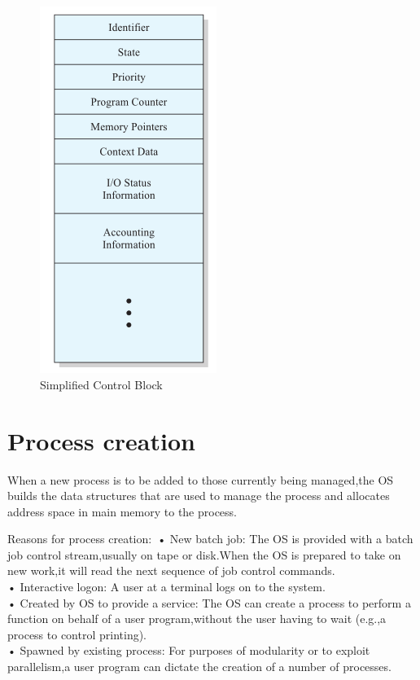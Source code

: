 \\
\\
\begin{figure}
\centering
\includegraphics{img/simplifiedcontrolblock.PNG}
\caption{Simplified Control Block}
\label{fig:simpblock}
\end{figure}


\section{Process creation}
When a new process is to be added to those currently being
managed,the OS builds the data structures that are used to manage the process and
allocates address space in main memory to the process. 

Reasons for process creation:\
• New batch job: The OS is provided with a batch job control stream,usually on tape or
disk.When the OS is prepared to take on new work,it will read the
next sequence of job control commands.\\
• Interactive logon: A user at a terminal logs on to the system.\\
• Created by OS to provide a service: The OS can create a process to perform a function on behalf of a user
program,without the user having to wait (e.g.,a process to control
printing).\\
• Spawned by existing process: For purposes of modularity or to exploit parallelism,a user program
can dictate the creation of a number of processes.\\


